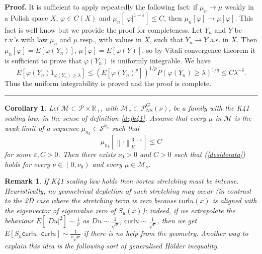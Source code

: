 \documentclass[11pt]{preprint}
\newtheorem{corollary}[theorem]{Corollary}
\newtheorem{remark}[theorem]{Remark}
\newenvironment{proof}[1][Proof]{\textbf{#1.} }{\ \rule{0.5em}{0.5em}}
\begin{document}
\begin{proof}
It is sufficient to apply repeatedly the following fact: if $\mu
_{n}\rightarrow\mu$ weakly in a Polish space $X$, $\varphi\in C\left(
X\right)  $ and $\mu_{n}\left[  \left|  \varphi\right|  ^{1+\varepsilon
}\right]  \leq C$, then $\mu_{n}\left[  \varphi\right]  \rightarrow\mu\left[
\varphi\right]  $. This fact is well know but we provide the proof for
completeness. Let $Y_{n}$ and $Y$ be r.v.'s with law $\mu_{n}$ and $\mu$
resp., with values in $X$, such that $Y_{n}\rightarrow Y$ a.s. in $X$. Then
$\mu_{n}\left[  \varphi\right]  =E\left[  \varphi\left(  Y_{n}\right)
\right]  $, $\mu\left[  \varphi\right]  =E\left[  \varphi\left(  Y\right)
\right]  $, so by Vitali convergence theorem it is sufficient to prove that
$\varphi\left(  Y_{n}\right)  $ is uniformly integrable. We have
\[
E\left[  \varphi\left(  Y_{n}\right)  1_{\varphi\left(  Y_{n}\right)
\geq\lambda}\right]  \leq\left(  E\left[  \varphi\left(  Y_{n}\right)
^{p}\right]  \right)  ^{1/p}P\left(  \varphi\left(  Y_{n}\right)  \geq
\lambda\right)  ^{1/q}\leq C\lambda^{-\delta}.
\]
Thus the uniform integrability is proved and the proof is complete.
\end{proof}

\begin{corollary}
\label{stretching under additional hp}Let $\mathcal{M}\subset\mathcal{P}%
\times\mathbb{R}_{+}$, with $\mathcal{M}_{\nu}\subset\mathcal{P}%
_{{\mathrm{NS}}}^{G}\left(  \nu\right)  $, be a family with the K41 scaling
law, in the sense of definition \ref{defk41}. Assume that every $\mu$ in
$\mathcal{M}$ is the weak limit of a sequence $\mu_{n_{k}}\in\mathcal{S}%
^{k_{n}}$ such that
\[
\mu_{n_{k}}\left[  \left\|  \cdot\right\|  _{V}^{3+\varepsilon}\right]  \leq C
\]
for some $\varepsilon,C>0$. Then there exists $\nu_{0}>0$ and $C>0$ such that
(\ref{desiderata}) holds for every $\nu\in\left(  0,\nu_{0}\right)  $ and
every $\mu\in\mathcal{M}_{\nu}$.
\end{corollary}

\begin{remark}
If K41 scaling law holds then vortex stretching must be intense.
Heuristically, no geometrical depletion of such stretching may occur (in
contrast to the 2D case where the stretching term is zero because
$\mathsf{curl}u\left(  x\right)  $ is aligned with the eigenvector of
eigenvalue zero of $S_{u}\left(  x\right)  $): indeed, if we extrapolate the
behaviour $E\left[  \left|  Du\right|  ^{2}\right]  \sim\frac{1}{\nu}$ as
$Du\sim\frac{1}{\sqrt{\nu}}$, $\mathsf{curl}u\sim\frac{1}{\sqrt{\nu}}$, then
we get $E\left[  S_{u}\mathsf{curl}u\cdot\mathsf{curl}u\right]  \sim\frac
{1}{\nu\sqrt{\nu}} $ if there is no help from the geometry. Another way to
explain this idea is the following sort of generalised H\"{o}lder inequality.
\end{remark}
\end{document}
